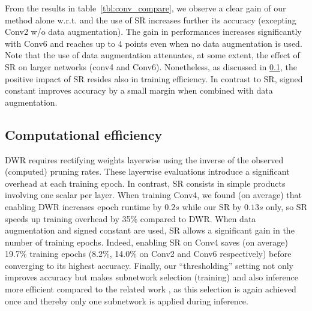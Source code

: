   From the results in table~\ref{tbl:conv_compare}, we observe a clear gain of
  our method alone w.r.t.  \cite{DBLP:conf/nips/ZhouLLY19} and the use of SR
  increases further its accuracy (excepting Conv2 w/o data augmentation).  The
  gain in performances increases  significantly with Conv6 and reaches up to 4
  points even when no data augmentation is used.   Note that the use of data
  augmentation attenuates, at some extent, the effect of \ac{SR} on larger networks
  (conv4 and Conv6). Nonetheless,  as discussed in \cref{sec:SR-impact}, the
  positive impact of \ac{SR} resides also in training efficiency.   In contrast to
  SR, signed constant improves accuracy by a small margin when combined with
  data augmentation. 
  
  
  \subsection{Computational efficiency}
  \label{sec:SR-impact}
DWR requires rectifying weights layerwise using the inverse of the observed
(computed) pruning rates. These layerwise evaluations introduce a significant
overhead at each training epoch. In contrast, \ac{SR} consists in simple products
involving one scalar per layer. When training Conv4, we found (on average) that
enabling DWR increases epoch runtime by $0.2s$ while our \ac{SR} by $0.13s$ only, so
SR speeds up training overhead by 35\% compared to DWR.  When data augmentation
and signed constant are used, \ac{SR} allows a significant gain in the number of
training epochs. Indeed, enabling \ac{SR} on Conv4  saves (on average) 19.7\%
training epochs (8.2\%, 14.0\%  on Conv2 and Conv6 respectively) before
converging to its highest accuracy. Finally, our ``thresholding'' setting not
only improves accuracy but makes subnetwork selection (training) and also
inference more efficient compared to the related work
\cite{DBLP:conf/nips/ZhouLLY19,DBLP:conf/cvpr/RamanujanWKFR20},  as this
selection is again achieved  once and thereby only one subnetwork is applied
during inference.
 

